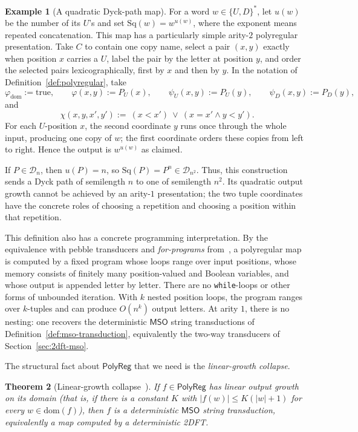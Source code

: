 \documentclass[11pt]{article}
\newtheorem{theorem}{Theorem}[section]
\theoremstyle{definition}
\newtheorem{example}[theorem]{Example}
\newcommand{\D}{\mathcal D}
\newcommand{\MSO}{\mathsf{MSO}}
\newcommand{\polyreg}{\mathsf{PolyReg}}
\begin{document}
\begin{example}[A quadratic Dyck-path map]\label{ex:dyck-squaring}
For a word $w\in\{U,D\}^*$, let $u(w)$ be the number of its $U$'s and set
$\mathrm{Sq}(w)=w^{u(w)}$, where the exponent means repeated concatenation.
This map has a particularly
simple arity-$2$ polyregular presentation.  Take $C$ to contain one copy name,
select a pair $(x,y)$ exactly when position $x$ carries a $U$, label the pair by
the letter at
position $y$, and order the selected pairs lexicographically, first by $x$ and
then by $y$.  In the notation of Definition~\ref{def:polyregular}, take
\[
  \varphi_{\mathrm{dom}}:=\mathrm{true},\qquad
  \varphi(x,y):=P_U(x),\qquad
  \psi_U(x,y):=P_U(y),\qquad
  \psi_D(x,y):=P_D(y),
\]
and
\[
  \chi(x,y,x',y') :=\ (x<x')\ \lor\ (x=x'\land y<y').
\]
For each $U$-position $x$, the second coordinate $y$ runs once through the
whole input, producing one copy of $w$; the first coordinate orders these
copies from left to right.  Hence the output is $w^{u(w)}$ as claimed.

If $P\in\D_n$, then $u(P)=n$, so
$\mathrm{Sq}(P)=P^n\in\D_{n^2}$.  Thus, this construction sends a Dyck path of
semilength $n$ to one of semilength $n^2$.  Its quadratic output growth cannot be achieved by an
arity-$1$ presentation; the two tuple coordinates have the concrete roles of
choosing a repetition and choosing a position within that repetition.
\end{example}

This definition also has a concrete programming interpretation.  By the
equivalence with pebble transducers and \emph{for-programs}
from~\cite{Bojanczyk2018,BojanczykKieferLhote2019}, a polyregular map is computed
by a fixed program whose loops range over input positions, whose memory
consists of finitely many position-valued and Boolean variables, and whose
output is appended letter by letter.  There are no \texttt{while}-loops or
other forms of unbounded iteration.  With $k$ nested position loops, the
program ranges over $k$-tuples and can produce $O(n^k)$ output letters.  At
arity $1$, there is no nesting: one recovers the deterministic $\MSO$
string transductions of Definition~\ref{def:mso-transduction}, equivalently
the two-way transducers of Section~\ref{sec:2dft-mso}.

The structural fact about $\polyreg$ that we need is the
\emph{linear-growth collapse}.

\begin{theorem}[Linear-growth collapse~\cite{Bojanczyk2018,Bojanczyk2023Growth}]
\label{thm:polyregular-linear-collapse}
If $f\in\polyreg$ has linear output growth on its domain (that is, if
there is a constant $K$ with $|f(w)|\le K(|w|+1)$ for every
$w\in\mathrm{dom}(f)$), then $f$ is a deterministic $\MSO$ string
transduction, equivalently a map computed by a deterministic 2DFT.
\end{theorem}
\end{document}
